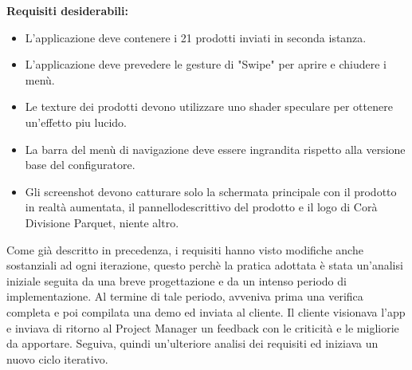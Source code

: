 \textbf{Requisiti desiderabili:}

\begin{itemize}
	\item L'applicazione deve contenere i 21 prodotti inviati in seconda istanza.
	
	\item L'applicazione deve prevedere le gesture di "Swipe" per aprire e chiudere i men\`u.
	
	\item Le texture dei prodotti devono utilizzare uno shader speculare per ottenere un'effetto piu lucido.
	
	\item La barra del men\`u di navigazione deve essere ingrandita rispetto alla versione base del configuratore.
	
	\item Gli screenshot devono catturare solo la schermata principale con il prodotto in realt\`a aumentata, il pannellodescrittivo del prodotto e il logo di Cor\`a Divisione Parquet, niente altro.
\end{itemize}

Come gi\`a descritto in precedenza, i requisiti hanno visto modifiche anche sostanziali ad ogni iterazione, questo perch\`e la pratica adottata \`e stata un'analisi iniziale seguita da una breve progettazione e da un intenso periodo di implementazione. Al termine di tale periodo, avveniva prima una verifica completa e poi compilata una demo ed inviata al cliente. Il cliente visionava l'app e inviava di ritorno al Project Manager un feedback con le criticit\`a e le migliorie da apportare. Seguiva, quindi un'ulteriore analisi dei requisiti ed iniziava un nuovo ciclo iterativo.\\\\


